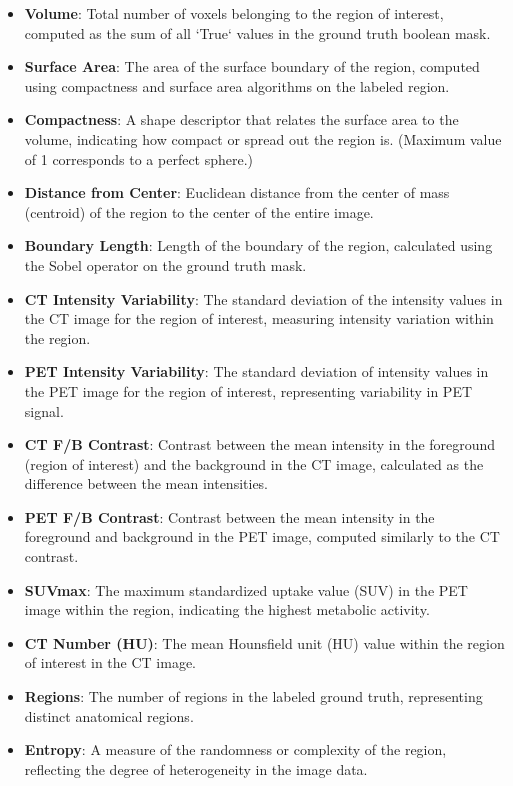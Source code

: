 \begin{itemize}
    \setlength\itemsep{1pt} 
    \setlength\parskip{0pt} 
    \setlength\topsep{0pt} 
    \label{list:properties}
    \item \textbf{Volume}: Total number of voxels belonging to the region of interest, computed as the sum of all `True` values in the ground truth boolean mask.
    \item \textbf{Surface Area}: The area of the surface boundary of the region, computed using compactness and surface area algorithms on the labeled region.
    \item \textbf{Compactness}: A shape descriptor that relates the surface area to the volume, indicating how compact or spread out the region is. (Maximum value of 1 corresponds to a perfect sphere.)
    \item \textbf{Distance from Center}: Euclidean distance from the center of mass (centroid) of the region to the center of the entire image.
    \item \textbf{Boundary Length}: Length of the boundary of the region, calculated using the Sobel operator on the ground truth mask.
    \item \textbf{CT Intensity Variability}: The standard deviation of the intensity values in the CT image for the region of interest, measuring intensity variation within the region.
    \item \textbf{PET Intensity Variability}: The standard deviation of intensity values in the PET image for the region of interest, representing variability in PET signal.
    \item \textbf{CT F/B Contrast}: Contrast between the mean intensity in the foreground (region of interest) and the background in the CT image, calculated as the difference between the mean intensities.
    \item \textbf{PET F/B Contrast}: Contrast between the mean intensity in the foreground and background in the PET image, computed similarly to the CT contrast.
    \item \textbf{SUVmax}: The maximum standardized uptake value (SUV) in the PET image within the region, indicating the highest metabolic activity.
    \item \textbf{CT Number (HU)}: The mean Hounsfield unit (HU) value within the region of interest in the CT image.
    \item \textbf{Regions}: The number of regions in the labeled ground truth, representing distinct anatomical regions.
    \item \textbf{Entropy}: A measure of the randomness or complexity of the region, reflecting the degree of heterogeneity in the image data.
\end{itemize}

